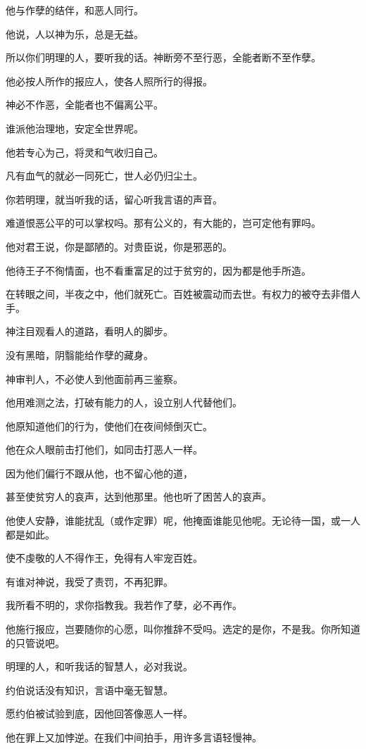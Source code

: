 \documentclass[12pt,oneside]{book}
\begin{document}
他与作孽的结伴，和恶人同行。

他说，人以神为乐，总是无益。

所以你们明理的人，要听我的话。神断旁不至行恶，全能者断不至作孽。

他必按人所作的报应人，使各人照所行的得报。

神必不作恶，全能者也不偏离公平。

谁派他治理地，安定全世界呢。

他若专心为己，将灵和气收归自己。

凡有血气的就必一同死亡，世人必仍归尘土。

你若明理，就当听我的话，留心听我言语的声音。

难道恨恶公平的可以掌权吗。那有公义的，有大能的，岂可定他有罪吗。

他对君王说，你是鄙陋的。对贵臣说，你是邪恶的。

他待王子不徇情面，也不看重富足的过于贫穷的，因为都是他手所造。

在转眼之间，半夜之中，他们就死亡。百姓被震动而去世。有权力的被夺去非借人手。

神注目观看人的道路，看明人的脚步。

没有黑暗，阴翳能给作孽的藏身。

神审判人，不必使人到他面前再三鉴察。

他用难测之法，打破有能力的人，设立别人代替他们。

他原知道他们的行为，使他们在夜间倾倒灭亡。

他在众人眼前击打他们，如同击打恶人一样。

因为他们偏行不跟从他，也不留心他的道，

甚至使贫穷人的哀声，达到他那里。他也听了困苦人的哀声。

他使人安静，谁能扰乱（或作定罪）呢，他掩面谁能见他呢。无论待一国，或一人都是如此。

使不虔敬的人不得作王，免得有人牢宠百姓。

有谁对神说，我受了责罚，不再犯罪。

我所看不明的，求你指教我。我若作了孽，必不再作。

他施行报应，岂要随你的心愿，叫你推辞不受吗。选定的是你，不是我。你所知道的只管说吧。

明理的人，和听我话的智慧人，必对我说。

约伯说话没有知识，言语中毫无智慧。

愿约伯被试验到底，因他回答像恶人一样。

他在罪上又加悖逆。在我们中间拍手，用许多言语轻慢神。
\end{document}
